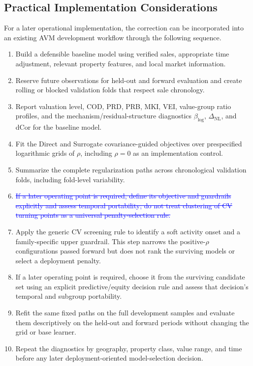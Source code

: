 \documentclass[10pt]{article}
\theoremstyle{definition}
\newcommand{\1}{\mathbf{1}}
\newcommand{\oldtext}[1]{\textcolor{blue}{\sout{#1}}}
\newcommand{\newtext}[1]{\textcolor{impGreen}{#1}}
\newcommand{\latesttext}[1]{\textcolor{latestPurple}{#1}}
\begin{document}
\subsection{\texorpdfstring{
\newtext{Practical Implementation Considerations}}{Practical Implementation Considerations}}
\label{sec:implementation_workflow}

\newtext{For a later operational implementation, the correction can be incorporated into an existing AVM development workflow through the following sequence.}

\begin{enumerate}[leftmargin=7mm]
    \item Build a defensible baseline model using verified sales, appropriate time adjustment, relevant property features, and local market information.
    \item Reserve future observations for held-out and forward evaluation and create rolling or blocked validation folds that respect sale chronology.
    \item Report valuation level, COD, PRD, PRB, MKI, VEI, value-group ratio profiles, and the mechanism/residual-structure diagnostics $\beta_{\log}$, $\Delta_{\mathrm{NL}}$, and dCor for the baseline model.
    \item Fit the Direct and Surrogate covariance-guided objectives over prespecified logarithmic grids of $\rho$, including $\rho=0$ as an implementation control.
    \item Summarize the complete regularization paths across chronological validation folds, including fold-level variability.
    \item \oldtext{If a later operating point is required, define its objective and guardrails explicitly and assess temporal portability; do not treat clustering of CV turning points as a universal penalty-selection rule.}
    \item \latesttext{Apply the generic CV screening rule to identify a soft activity onset and a family-specific upper guardrail. This step narrows the positive-$\rho$ configurations passed forward but does not rank the surviving models or select a deployment penalty.}
    \item \latesttext{If a later operating point is required, choose it from the surviving candidate set using an explicit predictive/equity decision rule and assess that decision's temporal and subgroup portability.}
    \item Refit the same fixed paths on the full development samples and evaluate them descriptively on the held-out and forward periods without changing the grid or base learner.
    \item Repeat the diagnostics by geography, property class, value range, and time before any later deployment-oriented model-selection decision.
\end{enumerate}
\end{document}
